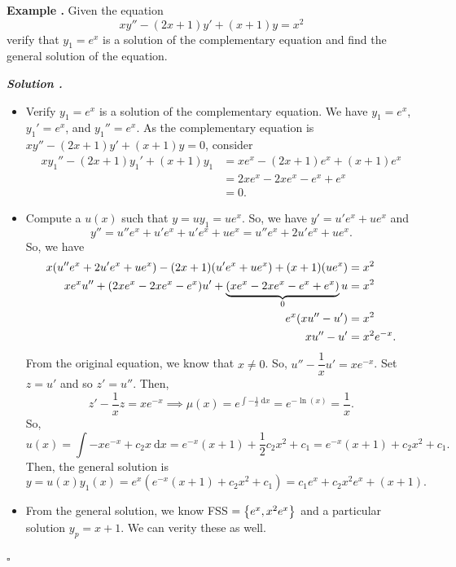 \documentclass[12pt, a4paper]{article}
\newcounter{index}[subsection]
\newenvironment*{eg}{\begin{framed}\par\noindent\textbf{Example \thesubsection.\stepcounter{index}\theindex}}{\par\end{framed}}
\newcounter{nprf}[subsection]
\newenvironment*{sol}{\par\indent\textbf{\textit{Solution \stepcounter{nprf}\thenprf.}}\par}{\hfill{$\square$}\par}
\def\d{{\mathrm{d}}}
\begin{document}
\begin{eg}
	Given the equation \[xy''-(2x+1)y'+(x+1)y=x^2\] verify that $y_1=e^x$ is a solution of the complementary equation and find the general solution of the equation. 
	\begin{sol}
	\begin{itemize}
		\item Verify $y_1=e^x$ is a solution of the complementary equation. We have $y_1=e^{x}$, $y_1'=e^{x}$, and $y_1''=e^{x}$. As the complementary equation is $xy''-(2x+1)y'+(x+1)y=0$, consider \begin{align*}xy_1''-(2x+1)y_1'+(x+1)y_1&=xe^x-(2x+1)e^x+(x+1)e^x\\&=2xe^{x}-2xe^{x}-e^x+e^x\\&=0.\end{align*}
		\item Compute a $u(x)$ such that $y=uy_1=ue^{x}$. So, we have $y'=u'e^x+ue^x$ and \[y''=u''e^x+u'e^x+u'e^x+ue^x=u''e^x+2u'e^x+ue^x.\] So, we have \begin{align*}x\qty(u''e^x+2u'e^x+ue^x)-(2x+1)(u'e^x+ue^x)+(x+1)(ue^x)&=x^2\\xe^xu''+(2xe^x-2xe^x-e^x)u'+\underbrace{(xe^x-2xe^x-e^x+e^x)}_0u&=x^2\\e^x(xu''-u')&=x^2\\xu''-u'&=x^2e^{-x}.\end{align*} From the original equation, we know that $x\neq0$. So, $u''-\dfrac{1}{x}u'=xe^{-x}$. Set $z=u'$ and so $z'=u''$. Then, \[z'-\dfrac{1}{x}z=xe^{-x}\implies\mu(x)=e^{\int-\frac{1}{x}\ \d{x}}=e^{-\ln(x)}=\dfrac{1}{x}.\] So, \[u(x)=\int-xe^{-x}+c_2x\ \d{x}=e^{-x}(x+1)+\dfrac{1}{2}c_2x^2+c_1=e^{-x}(x+1)+c_2x^2+c_1.\] Then, the general solution is \[y=u(x)y_1(x)=e^{x}(e^{-x}(x+1)+c_2x^2+c_1)=c_1e^x+c_2x^2e^x+(x+1).\]
		\item From the general solution, we know FSS $=\qty{e^x,x^2e^x}$ and a particular solution $y_p=x+1$. We can verity these as well. 
	\end{itemize}	
	\end{sol}
\end{eg}
\end{document}
